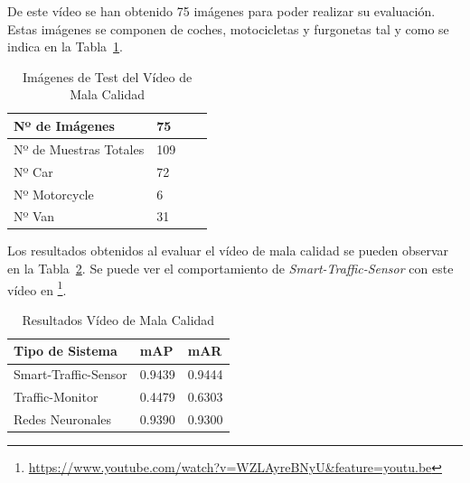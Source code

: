 De este vídeo se han obtenido 75 imágenes para poder realizar su evaluación. Estas imágenes se componen de coches, motocicletas y furgonetas tal y como se indica en la Tabla~\ref{tabla_video_mala_calidad}. 

\begin{table}[H] 
\begin{center}
\begin{tabular}{|l|l|l|l|}
\hline
Nº de Imágenes  & 75 \\
\hline \hline
Nº de Muestras Totales & 109\\ \hline
Nº Car & 72 \\ \hline
Nº Motorcycle & 6 \\ \hline
Nº Van & 31 \\ \hline
\end{tabular}
\caption{Imágenes de Test del Vídeo de Mala Calidad}
\label{tabla_video_mala_calidad}
\end{center}
\end{table}

Los resultados obtenidos al evaluar el vídeo de mala calidad se pueden observar en la Tabla~\ref{resultados_video_mala_calidad}. Se puede ver el comportamiento de \textit{Smart-Traffic-Sensor} con este vídeo en \footnote{\url{https://www.youtube.com/watch?v=WZLAyreBNyU&feature=youtu.be}}.

\begin{table}[H] 
\begin{center}
\begin{tabular}{|l|l|l|}
\hline
Tipo de Sistema & mAP & mAR  \\ 
\hline \hline
Smart-Traffic-Sensor & 0.9439 & 0.9444 \\ \hline
Traffic-Monitor & 0.4479 & 0.6303 \\ \hline
Redes Neuronales & 0.9390 & 0.9300\\ \hline
\end{tabular}
\caption{Resultados Vídeo de Mala Calidad}
\label{resultados_video_mala_calidad}
\end{center}
\end{table}

